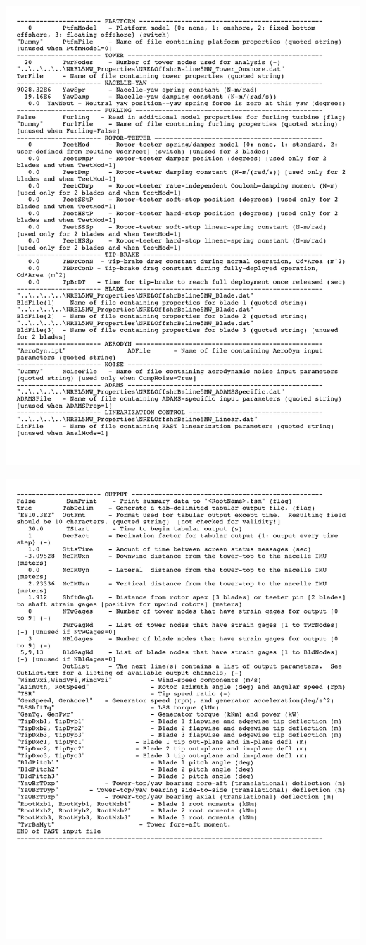 \noindent
\includegraphics[width=\linewidth]{Figures/AppendixAFigures/primaryP4.pdf}	

\noindent
\includegraphics[width=\linewidth]{Figures/AppendixAFigures/primaryP5.pdf}	



